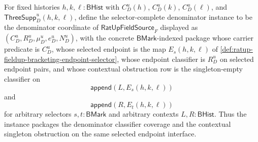 \begin{definition}
\label{def:ratup-fieldup-selector-complete-denominator-instance}
For fixed histories $h,k,\ell:\mathsf{BHist}$ with $C_D^u(h)$, $C_D^u(k)$,
$C_D^u(\ell)$, and $\mathsf{ThreeSupp}_D^u(h,k,\ell)$, define the
selector-complete denominator instance to be the denominator coordinate of
$\mathsf{RatUpFieldSource}_F$ displayed as
$(C_D^u,R_D^u,\mu_D^u,e_D^u,N_D^u)$, with the concrete
$\mathsf{BMark}$-indexed package whose carrier predicate is $C_D^u$, whose
selected endpoint is the map $E_s(h,k,\ell)$ of
\autoref{def:ratup-fieldup-bracketing-endpoint-selector}, whose endpoint
classifier is $R_D^u$ on selected endpoint pairs, and whose contextual
obstruction row is the singleton-empty classifier on
$$
\mathsf{append}(L,E_s(h,k,\ell))
$$
and
$$
\mathsf{append}(R,E_t(h,k,\ell))
$$
for arbitrary selectors $s,t:\mathsf{BMark}$ and arbitrary contexts
$L,R:\mathsf{BHist}$. Thus the instance packages the denominator classifier
coverage and the contextual singleton obstruction on the same selected
endpoint interface.
\end{definition}

